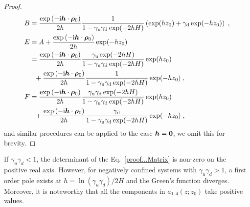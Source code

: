 \begin{proof}
\begin{align*}
B&=\frac{ \exp{(-\mathrm{i} \boldsymbol{h} \cdot \boldsymbol{\rho}_0)} }{2h }\frac{1}{1-\gamma_{\mathrm{u}}\gamma_{\mathrm{d}}\exp(-2hH)} \left(\exp(hz_0)+\gamma_{\mathrm{d}}\exp(-hz_0)\right)\;,\\
E&=A+\frac{\exp{(-\mathrm{i} \boldsymbol{h} \cdot \boldsymbol{\rho}_0)} }{2h }\exp(-hz_0)\\
&=\frac{\exp{(-\mathrm{i} \boldsymbol{h} \cdot \boldsymbol{\rho}_0)}}{2h }\frac{\gamma_{\mathrm{u}}\exp(-2hH)}{1-\gamma_{\mathrm{u}}\gamma_{\mathrm{d}}\exp(-2hH)} \exp(hz_0)\\&~~+\frac{\exp{(-\mathrm{i} \boldsymbol{h} \cdot \boldsymbol{\rho}_0)}}{2h }\frac{1}{1-\gamma_{\mathrm{u}}\gamma_{\mathrm{d}}\exp(-2hH)}\exp(-hz_0)\;,\\
F&=\frac{\exp{(-\mathrm{i} \boldsymbol{h} \cdot \boldsymbol{\rho}_0)}}{2h }\frac{\gamma_{\mathrm{u}}\gamma_{\mathrm{d}}\exp(-2hH)}{1-\gamma_{\mathrm{u}}\gamma_{\mathrm{d}}\exp(-2hH)} \exp(hz_0)\\&~~+\frac{\exp{(-\mathrm{i} \boldsymbol{h} \cdot \boldsymbol{\rho}_0)}}{2h }\frac{\gamma_{\mathrm{d}}}{1-\gamma_{\mathrm{u}}\gamma_{\mathrm{d}}\exp(-2hH)} \exp(-hz_0)\;,
\end{align*}
 and similar procedures can be applied to the case $\boldsymbol{h}=\bm{0}$, we omit this for brevity.
\end{proof}

\begin{rmk}\label{Remark...Nonzero+larger}
    If $\gamma_u \gamma_d < 1$, the determinant of the Eq.~\eqref{proof...Matrix} is non-zero on the positive real axis.
    However, for negatively confined systems with $\gamma_u \gamma_d > 1$, a first order pole exists at $h= \ln(\gamma_u \gamma_d)/2H$ and the Green's function diverges.
    Moreover, it is noteworthy that all the components in $a_{1:4}(z;z_0)$ take positive values. 
\end{rmk}


